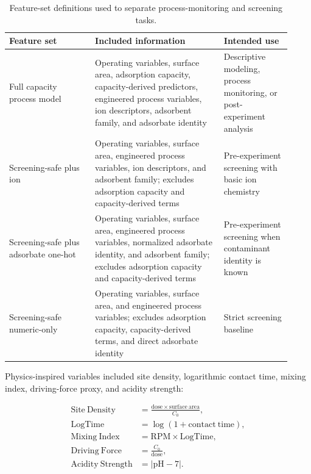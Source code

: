 \documentclass[review,12pt,number]{elsarticle}
\begin{document}
\begin{table}[htbp]
\centering
\caption{Feature-set definitions used to separate process-monitoring and screening tasks.}
\label{tab:features}
\small
\begin{tabular}{>{\raggedright\arraybackslash}p{0.28\linewidth}>{\raggedright\arraybackslash}p{0.42\linewidth}>{\raggedright\arraybackslash}p{0.22\linewidth}}
\toprule
Feature set & Included information & Intended use \\
\midrule
Full capacity process model & Operating variables, surface area, adsorption capacity, capacity-derived predictors, engineered process variables, ion descriptors, adsorbent family, and adsorbate identity & Descriptive modeling, process monitoring, or post-experiment analysis \\
Screening-safe plus ion & Operating variables, surface area, engineered process variables, ion descriptors, and adsorbent family; excludes adsorption capacity and capacity-derived terms & Pre-experiment screening with basic ion chemistry \\
Screening-safe plus adsorbate one-hot & Operating variables, surface area, engineered process variables, normalized adsorbate identity, and adsorbent family; excludes adsorption capacity and capacity-derived terms & Pre-experiment screening when contaminant identity is known \\
Screening-safe numeric-only & Operating variables, surface area, and engineered process variables; excludes adsorption capacity, capacity-derived terms, and direct adsorbate identity & Strict screening baseline \\
\bottomrule
\end{tabular}
\end{table}

Physics-inspired variables included site density, logarithmic contact time, mixing index, driving-force proxy, and acidity strength:

\begin{align}
\mathrm{Site\ Density} &= \frac{\mathrm{dose}\times \mathrm{surface\ area}}{C_0}, \\
\mathrm{LogTime} &= \log(1+\mathrm{contact\ time}), \\
\mathrm{Mixing\ Index} &= \mathrm{RPM}\times \mathrm{LogTime}, \\
\mathrm{Driving\ Force} &= \frac{C_0}{\mathrm{dose}}, \\
\mathrm{Acidity\ Strength} &= |\mathrm{pH}-7|.
\end{align}
\end{document}
